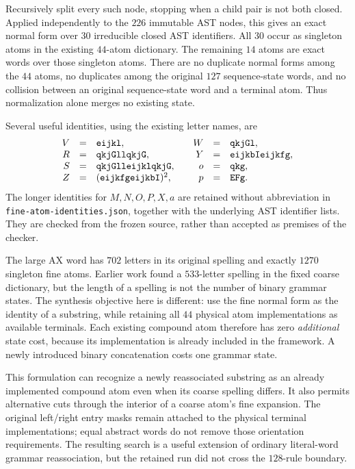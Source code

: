 Recursively split every such node, stopping when a child pair is not both
closed. Applied independently to the $226$ immutable AST nodes, this gives
an exact normal form over $30$ irreducible closed AST identifiers. All $30$
occur as singleton atoms in the existing $44$-atom dictionary. The remaining
$14$ atoms are exact words over those singleton atoms. There are no duplicate
normal forms among the $44$ atoms, no duplicates among the original $127$
sequence-state words, and no collision between an original sequence-state
word and a terminal atom. Thus normalization alone merges no existing state.

Several useful identities, using the existing letter names, are
\[
\begin{array}{rcl@{\qquad}rcl}
 V&=&\mathtt{eijkl},&W&=&\mathtt{qkjGl},\\
 R&=&\mathtt{qkjGllqkjG},&Y&=&\mathtt{eijkbIeijkfg},\\
 S&=&\mathtt{qkjGlleijklqkjG},&o&=&\mathtt{qkg},\\
 Z&=&(\mathtt{eijkfgeijkbI})^2,&p&=&\mathtt{EFg}.
\end{array}
\]
The longer identities for $M,N,O,P,X,a$ are retained without abbreviation
in \texttt{fine-atom-identities.json}, together with the underlying AST
identifier lists. They are checked from the frozen source, rather than
accepted as premises of the checker.

The large AX word has $702$ letters in its original spelling and exactly
$1270$ singleton fine atoms. Earlier work found a $533$-letter spelling in
the fixed coarse dictionary, but the length of a spelling is not the number
of binary grammar states. The synthesis objective here is different: use
the fine normal form as the identity of a substring, while retaining all
$44$ physical atom implementations as available terminals. Each existing
compound atom therefore has zero \emph{additional} state cost, because its
implementation is already included in the framework. A newly introduced
binary concatenation costs one grammar state.

This formulation can recognize a newly reassociated substring as an
already implemented compound atom even when its coarse spelling differs.
It also permits alternative cuts through the interior of a coarse atom's
fine expansion. The original left/right entry masks remain attached to the
physical terminal implementations; equal abstract words do not remove those
orientation requirements. The resulting search is a useful extension of
ordinary literal-word grammar reassociation, but the retained run did not
cross the $128$-rule boundary.

